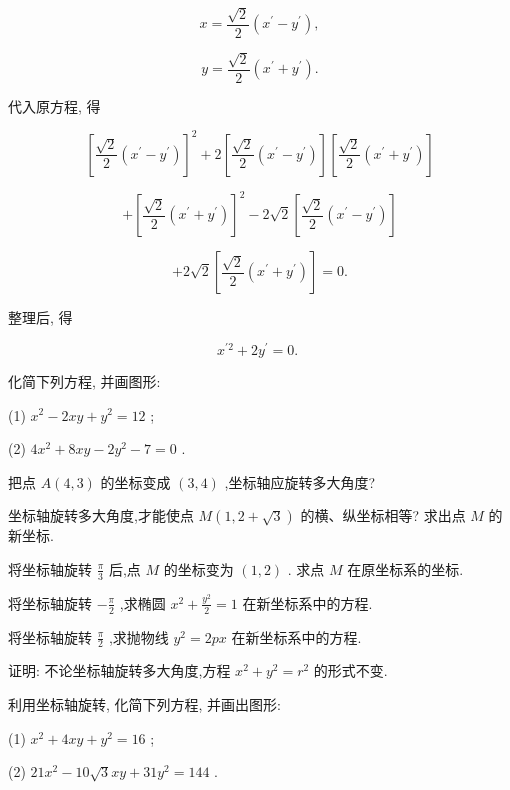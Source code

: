 \documentclass[lang=cn,newtx,10pt,scheme=chinese]{elegantbook}
\begin{document}
\[
  x = \frac{\sqrt{2}}{2}\left( {{x}^{\prime } - {y}^{\prime }}\right) ,
\]

\[
  y = \frac{\sqrt{2}}{2}\left( {{x}^{\prime } + {y}^{\prime }}\right) .
\]

代入原方程, 得

\[
    {\left\lbrack \frac{\sqrt{2}}{2}\left( {x}^{\prime } - {y}^{\prime }\right) \right\rbrack }^{2} + 2\left\lbrack {\frac{\sqrt{2}}{2}\left( {{x}^{\prime } - {y}^{\prime }}\right) }\right\rbrack \left\lbrack {\frac{\sqrt{2}}{2}\left( {{x}^{\prime } + {y}^{\prime }}\right) }\right\rbrack
\]

\[
  + {\left\lbrack \frac{\sqrt{2}}{2}\left( {x}^{\prime } + {y}^{\prime }\right) \right\rbrack }^{2} - 2\sqrt{2}\left\lbrack {\frac{\sqrt{2}}{2}\left( {{x}^{\prime } - {y}^{\prime }}\right) }\right\rbrack
\]

\[
  + 2\sqrt{2}\left\lbrack {\frac{\sqrt{2}}{2}\left( {{x}^{\prime } + {y}^{\prime }}\right) }\right\rbrack = 0.
\]

整理后, 得

\[
    {x}^{\prime 2} + 2{y}^{\prime } = 0\text{. }
\]

\begin{problemset}[练习]

\item 化简下列方程, 并画图形:

(1) \({x}^{2} - {2xy} + {y}^{2} = {12}\) ;

(2) \(4{x}^{2} + {8xy} - 2{y}^{2} - 7 = 0\) .

\end{problemset}


\begin{problemset}[习题十一]

\item 把点 \(A\left( {4,3}\right)\) 的坐标变成 \(\left( {3,4}\right)\) ,坐标轴应旋转多大角度?

\item 坐标轴旋转多大角度,才能使点 \(M\left( {1,2 + \sqrt{3}}\right)\) 的横、纵坐标相等? 求出点 \(M\) 的新坐标.

\item 将坐标轴旋转 \(\frac{\pi }{3}\) 后,点 \(M\) 的坐标变为 \(\left( {1,2}\right)\) . 求点 \(M\) 在原坐标系的坐标.

\item 将坐标轴旋转 \(- \frac{\pi }{2}\) ,求椭圆 \({x}^{2} + \frac{{y}^{2}}{2} = 1\) 在新坐标系中的方程.

\item 将坐标轴旋转 \(\frac{\pi }{2}\) ,求抛物线 \({y}^{2} = {2px}\) 在新坐标系中的方程.

\item 证明: 不论坐标轴旋转多大角度,方程 \({x}^{2} + {y}^{2} = {r}^{2}\) 的形式不变.

\item 利用坐标轴旋转, 化简下列方程, 并画出图形:

(1) \({x}^{2} + {4xy} + {y}^{2} = {16}\) ;

(2) \({21}{x}^{2} - {10}\sqrt{3}{xy} + {31}{y}^{2} = {144}\) .

\end{problemset}
\end{document}
